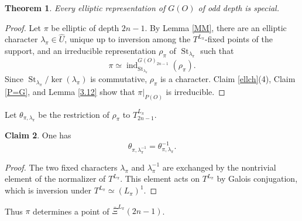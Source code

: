 \documentclass[11pt,a4paper,twoside]{amsart}
\newtheorem{theorem}{Theorem}[section]
\theoremstyle{definition}
\newtheorem{claim}[theorem]{Claim}
\theoremstyle{remark}
\newcommand{\bl}{\lambda}
\newcommand{\ind}{\operatorname{ind}}
\newcommand{\St}{\operatorname{St}}
\begin{document}
\begin{theorem}\label{charodd}
Every elliptic representation of $G(O)$ of odd depth is special.
\end{theorem}
\begin{proof}
Let $\pi$ be elliptic of depth $2n-1$. By Lemma \ref{MM}, there are an elliptic character $\bl_\pi\in\widehat U$, unique up to inversion among the $T^{L_\pi}$-fixed points of the support, and an irreducible representation $\rho_\pi$ of $\St_{\bl_\pi}$ such that
$$
\pi\simeq\ind_{\St_{\bl_\pi}}^{G(O)_{2n-1}}(\rho_\pi).
$$
Since $\St_{\bl_\pi}/\ker(\bl_\pi)$ is commutative, $\rho_\pi$ is a character. Claim \ref{ellch}(4), Claim \ref{P=G}, and Lemma \ref{3.12} show that $\pi|_{P(O)}$ is irreducible.
\end{proof}
Let $\theta_{\pi,\bl_\pi}$ be the restriction of $\rho_\pi$ to $T^{L_\pi}_{2n-1}$.
\begin{claim}\label{inv}
One has
$$
\theta_{\pi,\bl_\pi^{-1}}=\theta_{\pi,\bl_\pi}^{-1}.
$$
\end{claim}
\begin{proof}
The two fixed characters $\bl_\pi$ and $\bl_\pi^{-1}$ are exchanged by the nontrivial element of the normalizer of $T^{L_\pi}$. This element acts on $T^{L_\pi}$ by Galois conjugation, which is inversion under $T^{L_\pi}\simeq(L_\pi)^1$.
\end{proof}
Thus $\pi$ determines a point of $\bar\Xi^{L_\pi}(2n-1)$.
\end{document}
